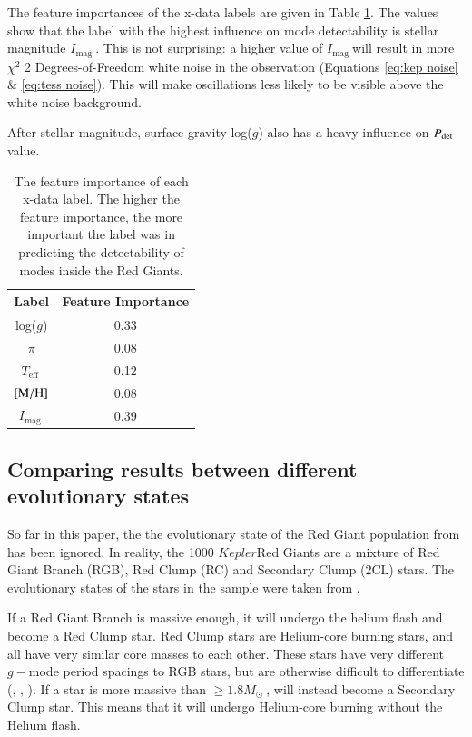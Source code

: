 \documentclass[a4paper,fleqn,usenatbib,useAMS]{mnras}
\newcommand{\teff}{\ensuremath{T_{\textrm{eff}}\:}}
\newcommand{\kep}{\ensuremath{Kepler}\:}
\newcommand{\pdet}{\ensuremath{P_{\rm det}\:}}
\newcommand{\imag}{\ensuremath{I_{\textrm{mag}}\:}}
\newcommand{\msol}{\ensuremath{M_{\odot}\:}}
\begin{document}
The feature importances of the x-data labels are given in Table \ref{tab: feature}. The values show that the label with the highest influence on mode detectability is stellar magnitude \imag. This is not surprising: a higher value of \imag will result in more $\chi^{2}$ 2 Degrees-of-Freedom white noise in the observation (Equations \ref{eq:kep noise} \& \ref{eq:tess noise}). This will make oscillations less likely to be visible above the white noise background.

After stellar magnitude, surface gravity log($g$) also has a heavy influence on \pdet value.
\begin{table}
\begin{center}
\begin{tabular}{ |c|c| }
Label        & Feature Importance \\
\hline
log($g$)     & 0.33               \\
$\pi$        & 0.08               \\
\teff        & 0.12               \\
$\rm [M/H]$  & 0.08               \\
\imag        & 0.39               \\
\end{tabular}
\end{center}
\caption{The feature importance of each x-data label. The higher the feature importance, the more important the label was in predicting the detectability of modes inside the Red Giants.}
\label{tab: feature}
\end{table}


\subsection{Comparing results between different evolutionary states}
\label{sect: evo states}

So far in this paper, the the evolutionary state of the Red Giant population from \citet{davies_asteroseismology_2016} has been ignored. In reality, the 1000 \kep Red Giants are a mixture of Red Giant Branch (RGB), Red Clump (RC) and Secondary Clump (2CL) stars. The evolutionary states of the stars in the sample were taken from \citet{elsworth_new_2017}. 

If a Red Giant Branch is massive enough, it will undergo the helium flash and become a Red Clump star. Red Clump stars are Helium-core burning stars, and all have very similar core masses to each other. These stars have very different $g-$mode period spacings to RGB stars, but are otherwise difficult to differentiate (\citet{chaplin_asteroseismology_2013}, \citet{bedding_solar-like_2011}, \citet{beck_kepler_2011}). If a star is more massive than $\geqslant1.8 \msol$, will instead become a Secondary Clump star. This means that it will undergo Helium-core burning without the Helium flash.
\end{document}

